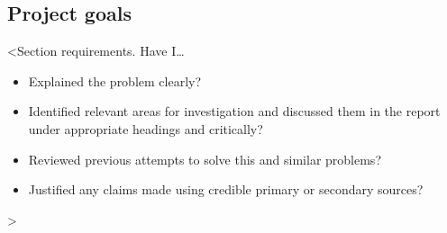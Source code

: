 \subsection{Project goals}

<Section requirements. Have I\dots
\begin{itemize}
    \item Explained the problem clearly?
    \item Identified relevant areas for investigation and discussed them in the report under appropriate headings and critically?
    \item Reviewed previous attempts to solve this and similar problems?
    \item Justified any claims made using credible primary or secondary sources?
\end{itemize}
>